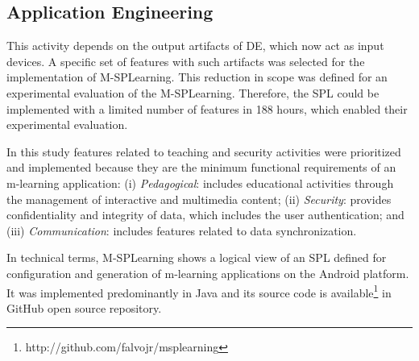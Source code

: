 \subsection{Application Engineering}\label{section32}

This activity depends on the output artifacts of DE, which now act as input devices. A specific set of features with such artifacts was selected for the implementation of M-SPLearning. This reduction in scope was defined for an experimental evaluation of the M-SPLearning. Therefore, the SPL could be implemented with a limited number of features in 188 hours, which enabled their experimental evaluation.

In this study features related to teaching and security activities were prioritized and implemented because they are the minimum functional requirements of an m-learning application: (i) \textit{Pedagogical}: includes educational activities through the management of interactive and multimedia content; (ii) \textit{Security}: provides confidentiality and integrity of data, which includes the user authentication; and (iii) \textit{Communication}: includes features related to data synchronization.

In technical terms,  M-SPLearning shows a logical view of an SPL defined for configuration and generation of m-learning applications on the Android platform. It was implemented predominantly in Java and its source code is available\footnote{http://github.com/falvojr/msplearning} in GitHub open source repository.


